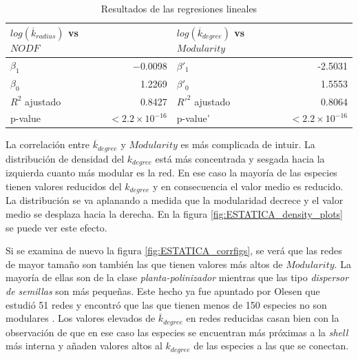 \begin{table}[ht]
\centering
\begin{tabular}{|l r | l r|}
\hline
$log(\overline {k}_{radius})$ vs $NODF$& & $log(\overline {k}_{degree})$ vs $Modularity$ & \\
\hline
$\beta_1$ & $-$0.0098 & $\beta'_1$ & -2.5031 \\
$\beta_0$ & 1.2269 & $\beta'_0$ & 1.5553 \\
$R^2$ ajustado&  0.8427  & $R'^2$ ajustado& 0.8064\\
p-value & $<2.2 \times 10^{-16}$& p-value' & $<2.2 \times 10^{-16}$\\
\hline
\end{tabular}
\caption{\label{table:table_lmodel} Resultados de las regresiones lineales}
\end{table}

La correlación entre $\overline {k}_{degree}$ y $Modularity$ es más complicada de intuir. La distribución de densidad del $k_{degree}$ está más concentrada y sesgada hacia la izquierda cuanto más modular es la red. En ese caso la mayoría de las especies tienen valores reducidos del ${k}_{degree}$ y en consecuencia el valor medio es reducido. La distribución se va aplanando a medida que la modularidad decrece y el valor medio se desplaza hacia la derecha. En la figura \ref{fig:ESTATICA_density_plots} se puede ver este efecto.

Si se examina de nuevo la figura \ref{fig:ESTATICA_corrfigs}, se verá que las redes de mayor tamaño son también las que tienen valores más altos de $Modularity$. La mayoría de ellas son de la clase \textit{planta-polinizador} mientras que las tipo \textit{dispersor de semillas} son más pequeñas. Este hecho ya fue apuntado por Olesen que estudió 51 redes y encontró que las que tienen menos de 150 especies no son modulares \cite{olesen2007modularity}. Los valores elevados de $\overline {k}_{degree}$ en redes reducidas casan bien con la observación de que en ese caso las especies se encuentran más próximas a la \textit{shell} más interna y añaden valores altos al ${k}_{degree}$ de las especies a las que se conectan.

